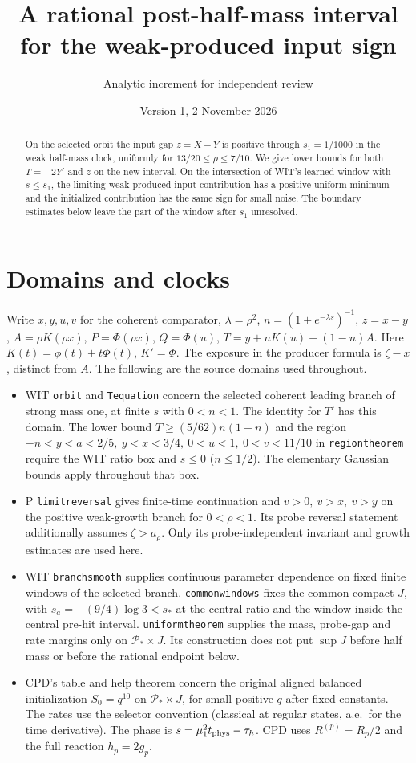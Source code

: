 \documentclass[11pt]{article}
\title{A rational post-half-mass interval for the weak-produced input sign}
\author{Analytic increment for independent review}\date{Version 1, 2 November 2026}
\begin{document}
\maketitle
\begin{abstract}
On the selected orbit the input gap \(z=X-Y\) is positive through
\(s_1=1/1000\) in the weak half-mass clock, uniformly for
\(13/20\le\rho\le7/10\). We give lower bounds for both \(T=-2Y'\)
and \(z\) on the new interval. On the intersection of WIT's learned
window with \(s\le s_1\), the limiting weak-produced input contribution
has a positive uniform minimum and the initialized contribution has
the same sign for small noise. The boundary estimates below leave
the part of the window after \(s_1\) unresolved.
\end{abstract}
\section{Domains and clocks}\label{an01phsv1:domains}
Write \(x,y,u,v\) for the coherent comparator, \(\lambda=\rho^2\),
\(n=(1+e^{-\lambda s})^{-1}\), \(z=x-y\), \(A=\rho K(\rho x)\),
\(P=\Phi(\rho x)\), \(Q=\Phi(u)\), \(T=y+nK(u)-(1-n)A\).
Here \(K(t)=\phi(t)+t\Phi(t)\), \(K'=\Phi\). The exposure in
the producer formula is \(\zeta-x\), distinct from \(A\).
The following are the source domains used throughout.
\begin{itemize}
\item WIT \texttt{orbit} and \texttt{Tequation} concern the selected
coherent leading branch of strong mass one, at finite \(s\) with
\(0<n<1\). The identity for \(T'\) has this domain. The lower bound
\(T\ge (5/62)n(1-n)\) and the region
\(-n<y<a<2/5,\ y<x<3/4,\ 0<u<1,\ 0<v<11/10\) in
\texttt{regiontheorem} require the WIT ratio box and \(s\le0\)
(\(n\le1/2\)). The elementary Gaussian bounds apply throughout that box.
\item P \texttt{limitreversal} gives finite-time continuation and
\(v>0,\ v>x,\ v>y\) on the positive weak-growth branch for
\(0<\rho<1\). Its probe reversal statement additionally assumes
\(\zeta>a_\rho\). Only its probe-independent invariant and growth
estimates are used here.
\item WIT \texttt{branchsmooth} supplies continuous parameter
dependence on fixed finite windows of the selected branch.
\texttt{commonwindows} fixes the common compact \(J\), with
\(s_a=-(9/4)\log3<s_*\) at the central ratio and the window inside the
central pre-hit interval. \texttt{uniformtheorem} supplies the mass,
probe-gap and rate margins only on \(\mathcal P_*\times J\).
Its construction does not put \(\sup J\) before half mass or before
the rational endpoint below.
\item CPD's table and help theorem concern the original aligned balanced
initialization \(S_0=q^{10}\) on \(\mathcal P_*\times J\), for small
positive \(q\) after fixed constants. The rates use the selector
convention (classical at regular states, a.e.\ for the time derivative).
The phase is \(s=\mu_1^2 t_{\rm phys}-\tau_h\). CPD uses
\(R^{(p)}=R_p/2\) and the full reaction \(h_p=2g_p\).
\end{itemize}
\end{document}
